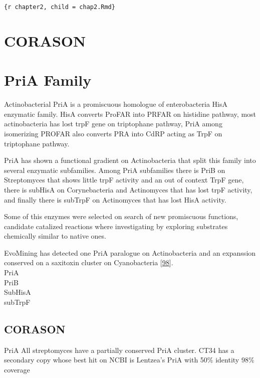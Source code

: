 \documentclass[12pt,twoside]{reedthesis}
\begin{document}
  \texttt{\{r\ chapter2,\ child\ =\ \textquotesingle{}chap2.Rmd\textquotesingle{}\}}
  
  \hypertarget{ref_labels}{\chapter{CORASON}\label{ref_labels}}
  
  \hypertarget{ref_labels}{\chapter{PriA Family}\label{ref_labels}}
  
  Actinobacterial PriA is a promiscuous homologue of enterobacteria HisA
  enzymatic family. HisA converts ProFAR into PRFAR on histidine pathway,
  most actinobacteria has lost trpF gene on triptophane pathway, PriA
  among isomerizing PROFAR also converts PRA into CdRP acting as TrpF on
  triptophane pathway.
  
  PriA has shown a functional gradient on Actinobacteria that split this
  family into several enzymatic subfamilies. Among PriA subfamilies there
  is PriB on Streptomyces that shows little trpF activity and an out of
  context TrpF gene, there is subHisA on Corynebacteria and Actinomyces
  that has lost trpF activity, and finally there is subTrpF on Actinomyces
  that has lost HisA activity.
  
  Some of this enzymes were selected on search of new promiscuous
  functions, candidate catalized reactions where investigating by
  exploring substrates chemically similar to native ones.
  
  EvoMining has detected one PriA paralogue on Actinobacteria and an
  expanssion conserved on a saxitoxin cluster on Cyanobacteria
  {[}\protect\hyperlink{ref-moustafa_origin_2009}{98}{]}.\\
  PriA\\
  PriB\\
  SubHisA\\
  subTrpF\\
  \clearpage   
  
  \section{CORASON}\label{corason}
  
  PriA All streptomyces have a partially conserved PriA cluster. CT34 has
  a secondary copy whose best hit on NCBI is Lentzea's PriA with 50\%
  identity 98\% coverage
  
\end{document}
